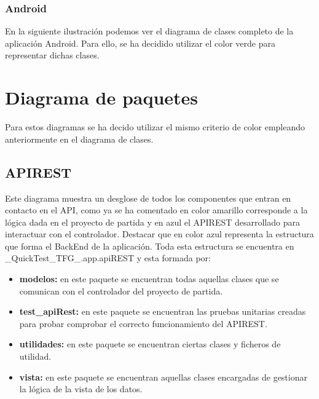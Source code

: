
\subsubsection{Android}
En la siguiente ilustración podemos ver el diagrama de clases completo de la aplicación Android. Para ello, se ha decidido utilizar el color verde para representar dichas clases.

\begin{landscape}
\end{landscape}



\section{Diagrama de paquetes}

Para estos diagramas se ha decido utilizar el mismo criterio de color empleando anteriormente en el diagrama de clases.

\subsection{APIREST}

Este diagrama muestra un desglose de todos los componentes que entran en contacto en el API, como ya se ha comentado en color amarillo corresponde a la lógica dada en el proyecto de partida y en azul el APIREST desarrollado para interactuar con el controlador. Destacar que en color azul representa la estructura que forma el BackEnd de la aplicación. Toda esta estructura se encuentra en  
\_QuickTest\_TFG\_.app.apiREST y esta formada por:

\begin{itemize}

	\item \textbf{modelos:} en este paquete se encuentran todas aquellas clases que se comunican con el controlador del proyecto de partida.
	\item \textbf{test\_apiRest:} en este paquete se encuentran las pruebas unitarias creadas para probar comprobar el correcto funcionamiento del APIREST.
	\item \textbf{utilidades:} en este paquete se encuentran ciertas clases y ficheros de utilidad.
	\item \textbf{vista:} en este paquete se encuentran aquellas clases encargadas de gestionar la lógica de la vista de los datos.

\end{itemize}

